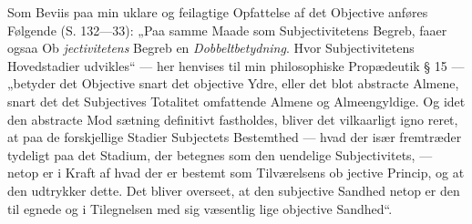 \documentclass[12pt]{book}
\newcommand{\opage}[1]{\marginnote{\footnotesize\textit{[#1]}}}
\begin{document}
Som Beviis paa min uklare og feilagtige Opfattelse
af det Objective anføres Følgende (S. 132---33): „Paa
samme Maade som Subjectivitetens Begreb, faaer ogsaa Ob\-%
\emph{jectivitetens} Begreb en \emph{Dobbeltbetydning}. Hvor %
Subjectivitetens Hovedstadier udvikles“ --- her henvises
til min philosophiske Propædeutik § 15 --- „betyder det
Objective snart det objective Ydre, eller det blot abstracte
Almene, snart det det Subjectives Totalitet omfattende
Almene og Almeengyldige. Og idet den abstracte Mod\-%
sætning definitivt fastholdes, bliver det vilkaarligt igno\-%
reret, at paa de forskjellige Stadier Subjectets Bestemthed
\opage{12}\setcounter{footnote}{0}%
--- hvad der især fremtræder tydeligt paa det Stadium,
der betegnes som den uendelige Subjectivitets, --- netop
er i Kraft af hvad der er bestemt som Tilværelsens ob\-%
jective Princip, og at den udtrykker dette. Det bliver
overseet, at den subjective Sandhed netop er den til\-%
egnede og i Tilegnelsen med sig væsentlig lige objective
Sandhed“.
\end{document}
